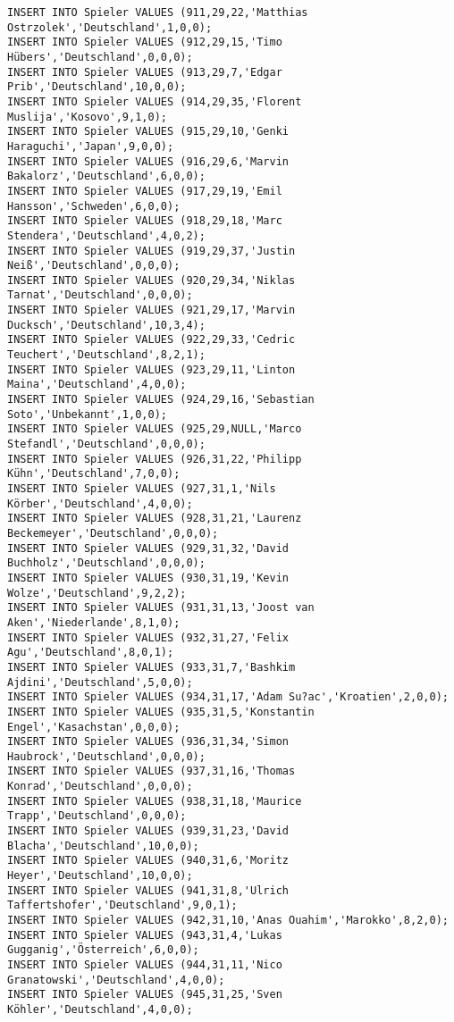 \documentclass{bschlangaul-aufgabe}
\begin{document}
\begin{verbatim}
INSERT INTO Spieler VALUES (911,29,22,'Matthias Ostrzolek','Deutschland',1,0,0);
INSERT INTO Spieler VALUES (912,29,15,'Timo Hübers','Deutschland',0,0,0);
INSERT INTO Spieler VALUES (913,29,7,'Edgar Prib','Deutschland',10,0,0);
INSERT INTO Spieler VALUES (914,29,35,'Florent Muslija','Kosovo',9,1,0);
INSERT INTO Spieler VALUES (915,29,10,'Genki Haraguchi','Japan',9,0,0);
INSERT INTO Spieler VALUES (916,29,6,'Marvin Bakalorz','Deutschland',6,0,0);
INSERT INTO Spieler VALUES (917,29,19,'Emil Hansson','Schweden',6,0,0);
INSERT INTO Spieler VALUES (918,29,18,'Marc Stendera','Deutschland',4,0,2);
INSERT INTO Spieler VALUES (919,29,37,'Justin Neiß','Deutschland',0,0,0);
INSERT INTO Spieler VALUES (920,29,34,'Niklas Tarnat','Deutschland',0,0,0);
INSERT INTO Spieler VALUES (921,29,17,'Marvin Ducksch','Deutschland',10,3,4);
INSERT INTO Spieler VALUES (922,29,33,'Cedric Teuchert','Deutschland',8,2,1);
INSERT INTO Spieler VALUES (923,29,11,'Linton Maina','Deutschland',4,0,0);
INSERT INTO Spieler VALUES (924,29,16,'Sebastian Soto','Unbekannt',1,0,0);
INSERT INTO Spieler VALUES (925,29,NULL,'Marco Stefandl','Deutschland',0,0,0);
INSERT INTO Spieler VALUES (926,31,22,'Philipp Kühn','Deutschland',7,0,0);
INSERT INTO Spieler VALUES (927,31,1,'Nils Körber','Deutschland',4,0,0);
INSERT INTO Spieler VALUES (928,31,21,'Laurenz Beckemeyer','Deutschland',0,0,0);
INSERT INTO Spieler VALUES (929,31,32,'David Buchholz','Deutschland',0,0,0);
INSERT INTO Spieler VALUES (930,31,19,'Kevin Wolze','Deutschland',9,2,2);
INSERT INTO Spieler VALUES (931,31,13,'Joost van Aken','Niederlande',8,1,0);
INSERT INTO Spieler VALUES (932,31,27,'Felix Agu','Deutschland',8,0,1);
INSERT INTO Spieler VALUES (933,31,7,'Bashkim Ajdini','Deutschland',5,0,0);
INSERT INTO Spieler VALUES (934,31,17,'Adam Su?ac','Kroatien',2,0,0);
INSERT INTO Spieler VALUES (935,31,5,'Konstantin Engel','Kasachstan',0,0,0);
INSERT INTO Spieler VALUES (936,31,34,'Simon Haubrock','Deutschland',0,0,0);
INSERT INTO Spieler VALUES (937,31,16,'Thomas Konrad','Deutschland',0,0,0);
INSERT INTO Spieler VALUES (938,31,18,'Maurice Trapp','Deutschland',0,0,0);
INSERT INTO Spieler VALUES (939,31,23,'David Blacha','Deutschland',10,0,0);
INSERT INTO Spieler VALUES (940,31,6,'Moritz Heyer','Deutschland',10,0,0);
INSERT INTO Spieler VALUES (941,31,8,'Ulrich Taffertshofer','Deutschland',9,0,1);
INSERT INTO Spieler VALUES (942,31,10,'Anas Ouahim','Marokko',8,2,0);
INSERT INTO Spieler VALUES (943,31,4,'Lukas Gugganig','Österreich',6,0,0);
INSERT INTO Spieler VALUES (944,31,11,'Nico Granatowski','Deutschland',4,0,0);
INSERT INTO Spieler VALUES (945,31,25,'Sven Köhler','Deutschland',4,0,0);

\end{verbatim}
\end{document}

